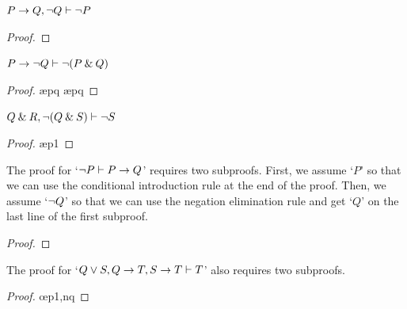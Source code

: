 \begin{earg}

\item $P \rightarrow Q, {\neg} Q \vdash {\neg} P$

\begin{proof}
	 \pr{}
	 \pr{}	
	\open
		 \as{}
		 
		 
	\close
	 
\end{proof}
\medskip


\item $P \rightarrow {\neg} Q \vdash {\neg}(P \mathbin{\&} Q)$

\begin{proof}
	 \pr{}	
	\open
		 \as{}
		 \ae{pq}
		 
		 \ae{pq}
	\close
	 
\end{proof}
\medskip

\begin{minipage}{10cm}
\item $Q \mathbin{\&} R, {\neg}(Q \mathbin{\&} S) \vdash {\neg} S$

\begin{proof}
	 \pr{}	
	 \pr{}
	\open
		 \as{}
		 \ae{p1}
		 
		 
	\close
	 
\end{proof}
\medskip
\end{minipage}


\item The proof for `${\neg} P \vdash P \rightarrow Q$' requires two subproofs. First, we assume `$P$' so that we can use the conditional introduction rule at the end of the proof. Then, we assume `${\neg} Q$' so that we can use the negation elimination rule and get `$Q$' on the last line of the first subproof.

\begin{proof}
	 \pr{}	
	\open
			\as{}
		\open
			 \as{}
			 
			 
		\close
		 
	\close
	 
\end{proof}
\medskip


\begin{minipage}{10cm}
\item The proof for  `$Q \vee S, Q \rightarrow T, S \rightarrow T \vdash T$' also requires two subproofs. 

\begin{proof}
	 \pr{}
	 \pr{}
	 \pr{}
	\open
		 \as{}
			\open
				 \as{}
				 \oe{p1,nq}
				 
				 
			\close
		 
		 
		 
	\close
	 
\end{proof}
\end{minipage}

\end{earg}



